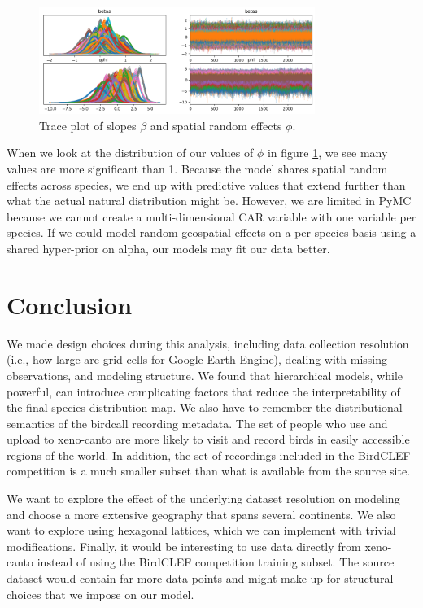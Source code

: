 \documentclass[notitlepage]{article}
\begin{document}
\begin{figure}[H]
\centering
\includegraphics[width=0.8\textwidth]{report/figures/trace_plot_phi.png}
\caption{Trace plot of slopes $\beta$ and spatial random effects $\phi$.}
\label{fig:trace_plot}
\end{figure}

When we look at the distribution of our values of $\phi$ in figure \ref{fig:trace_plot}, we see many values are more significant than 1.
Because the model shares spatial random effects across species, we end up with predictive values that extend further than what the actual natural distribution might be.
However, we are limited in PyMC because we cannot create a multi-dimensional CAR variable with one variable per species.
If we could model random geospatial effects on a per-species basis using a shared hyper-prior on alpha, our models may fit our data better.


\section{Conclusion}

We made design choices during this analysis, including data collection resolution (i.e., how large are grid cells for Google Earth Engine), dealing with missing observations, and modeling structure.
We found that hierarchical models, while powerful, can introduce complicating factors that reduce the interpretability of the final species distribution map.
We also have to remember the distributional semantics of the birdcall recording metadata.
The set of people who use and upload to xeno-canto are more likely to visit and record birds in easily accessible regions of the world.
In addition, the set of recordings included in the BirdCLEF competition is a much smaller subset than what is available from the source site.

We want to explore the effect of the underlying dataset resolution on modeling and choose a more extensive geography that spans several continents.
We also want to explore using hexagonal lattices, which we can implement with trivial modifications.
Finally, it would be interesting to use data directly from xeno-canto instead of using the BirdCLEF competition training subset.
The source dataset would contain far more data points and might make up for structural choices that we impose on our model.
\end{document}
